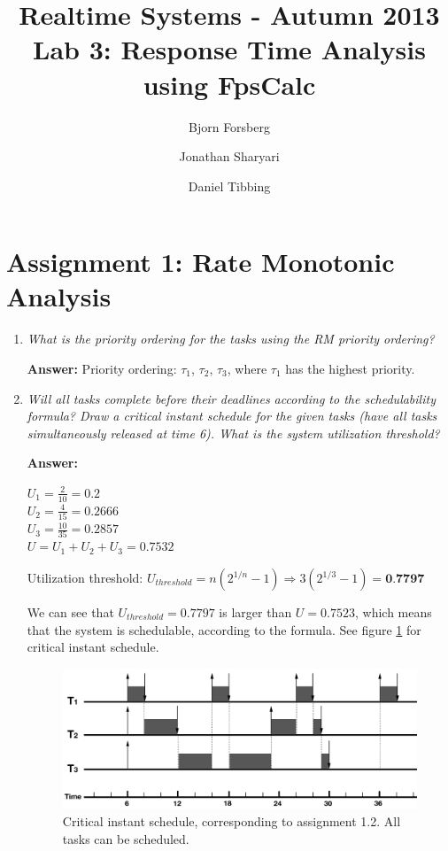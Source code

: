 \documentclass[a4paper,10pt]{article}
\title{Realtime Systems - Autumn 2013 \\ \textbf{Lab 3: Response Time Analysis using FpsCalc}}
\author{Bjorn Forsberg \and Jonathan Sharyari \and Daniel Tibbing}
\newcommand{\answer}{\textbf{Answer: }}
\begin{document}
\maketitle

\section{Assignment 1: Rate Monotonic Analysis}

\begin{enumerate}
	\item \emph{What is the priority ordering for the tasks using the RM priority ordering?}
	
	\answer Priority ordering: $\tau_1$, $\tau_2$, $\tau_3$, where $\tau_1$ has the highest priority.
	
	\item \emph{Will all tasks complete before their deadlines according to the schedulability formula? Draw a critical instant schedule for the given tasks (have all tasks simultaneously released at time 6). What is the system utilization threshold?}
	
	\answer
	
	$U_1 = \frac{2}{10} = 0.2$ \\
	$U_2 = \frac{4}{15} = 0.2666$ \\
	$U_3 = \frac{10}{35} = 0.2857$ \\
	$U = U_1 + U_2 + U_3 = 0.7532$
	
	Utilization threshold: $U_{threshold} = n(2^{1/n} - 1) \Rightarrow 3(2^{1/3} - 1) = \textbf{0.7797}$
	
	We can see that $U_{threshold} = 0.7797$ is larger than $U = 0.7523$, which means that the system is schedulable, according to the formula. See figure \ref{1_2} for critical instant schedule.
	
	\begin{figure}
	\includegraphics[scale=0.4]{1_2}
	\caption{Critical instant schedule, corresponding to assignment 1.2. All tasks can be scheduled.}
	\label{1_2}
	\end{figure}
	

\end{enumerate}
\end{document}
